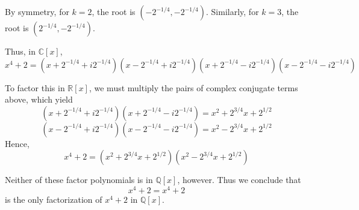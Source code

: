 \documentclass{article}
\theoremstyle{definition}
\newcommand{\R}{\mathbb{R}}
\newcommand{\Q}{\mathbb{Q}}
\newcommand{\Co}{\mathbb{C}}
\begin{document}
By symmetry, for $k=2$, the root is $(-2^{-1/4},-2^{-1/4})$. Similarly, for $k=3$, the root is 
$(2^{-1/4},-2^{-1/4})$.

Thus, in $\Co[x]$, 
\begin{equation}\label{complex}
x^4+2 
= 
(x+2^{-1/4} + i 2^{-1/4})
(x-2^{-1/4} + i 2^{-1/4})
(x+2^{-1/4} - i 2^{-1/4})
(x-2^{-1/4} - i 2^{-1/4})
\end{equation}

To factor this in $\R[x]$, we must multiply the pairs of complex conjugate terms above, which yield
\[
(x+2^{-1/4} + i 2^{-1/4})
(x+2^{-1/4} - i 2^{-1/4})
=
x^2+2^{3/4} x + 2^{1/2}
\]
\[
(x-2^{-1/4} + i 2^{-1/4})
(x-2^{-1/4} - i 2^{-1/4})
=
x^2-2^{3/4} x + 2^{1/2}
\]
Hence,
\begin{equation}\label{real}
x^4+2
=
(x^2+2^{3/4} x + 2^{1/2})
(x^2-2^{3/4} x + 2^{1/2})
\end{equation}

Neither of these factor polynomials is in $\Q[x]$, however. Thus we conclude that 
\begin{equation}\label{rational}
x^4 + 2 = x^4 + 2
\end{equation}
is the only factorization of $x^4+2$ in $\Q[x]$.
\end{document}
